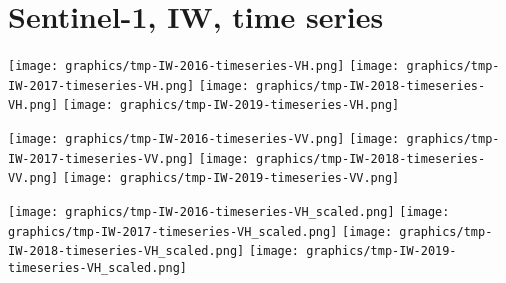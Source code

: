 
\section{Sentinel-1, IW, time series}
\setcounter{theorem}{0}

\renewcommand{\theenumi}{\roman{enumi}}
\renewcommand{\labelenumi}{\textnormal{(\theenumi)}$\;\;$}


\begin{center}
\begin{minipage}{7.0in}
\texttt{[image: graphics/tmp-IW-2016-timeseries-VH.png]}
\quad
\texttt{[image: graphics/tmp-IW-2017-timeseries-VH.png]}
\vskip 1.0cm
\texttt{[image: graphics/tmp-IW-2018-timeseries-VH.png]}
\quad
\texttt{[image: graphics/tmp-IW-2019-timeseries-VH.png]}
\end{minipage}
\end{center}


\clearpage
\begin{center}
\begin{minipage}{7.0in}
\texttt{[image: graphics/tmp-IW-2016-timeseries-VV.png]}
\quad
\texttt{[image: graphics/tmp-IW-2017-timeseries-VV.png]}
\vskip 1.0cm
\texttt{[image: graphics/tmp-IW-2018-timeseries-VV.png]}
\quad
\texttt{[image: graphics/tmp-IW-2019-timeseries-VV.png]}
\end{minipage}
\end{center}


\clearpage
\begin{center}
\begin{minipage}{7.0in}
\texttt{[image: graphics/tmp-IW-2016-timeseries-VH\_scaled.png]}
\quad
\texttt{[image: graphics/tmp-IW-2017-timeseries-VH\_scaled.png]}
\vskip 1.0cm
\texttt{[image: graphics/tmp-IW-2018-timeseries-VH\_scaled.png]}
\quad
\texttt{[image: graphics/tmp-IW-2019-timeseries-VH\_scaled.png]}
\end{minipage}
\end{center}


